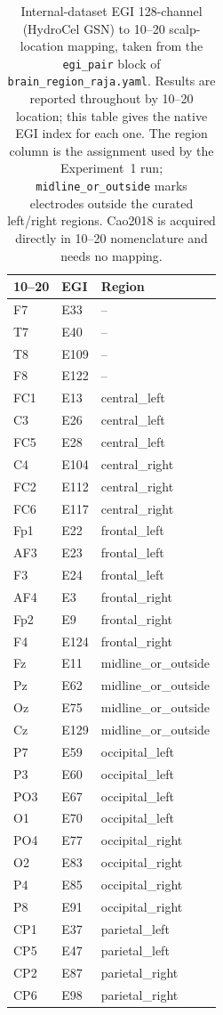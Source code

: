 \begin{table}[ht]
\centering
\footnotesize
\caption{Internal-dataset EGI 128-channel (HydroCel GSN) to 10--20 scalp-location mapping, taken from the \texttt{egi\_pair} block of \texttt{brain\_region\_raja.yaml}. Results are reported throughout by 10--20 location; this table gives the native EGI index for each one. The region column is the assignment used by the Experiment~1 run; \texttt{midline\_or\_outside} marks electrodes outside the curated left/right regions. Cao2018 is acquired directly in 10--20 nomenclature and needs no mapping.}
\label{tab:egi_map}
\begin{tabular}{lll}
\toprule
10--20 & EGI & Region \\
\midrule
F7 & E33 & -- \\
T7 & E40 & -- \\
T8 & E109 & -- \\
F8 & E122 & -- \\
FC1 & E13 & central\_left \\
C3 & E26 & central\_left \\
FC5 & E28 & central\_left \\
C4 & E104 & central\_right \\
FC2 & E112 & central\_right \\
FC6 & E117 & central\_right \\
Fp1 & E22 & frontal\_left \\
AF3 & E23 & frontal\_left \\
F3 & E24 & frontal\_left \\
AF4 & E3 & frontal\_right \\
Fp2 & E9 & frontal\_right \\
F4 & E124 & frontal\_right \\
Fz & E11 & midline\_or\_outside \\
Pz & E62 & midline\_or\_outside \\
Oz & E75 & midline\_or\_outside \\
Cz & E129 & midline\_or\_outside \\
P7 & E59 & occipital\_left \\
P3 & E60 & occipital\_left \\
PO3 & E67 & occipital\_left \\
O1 & E70 & occipital\_left \\
PO4 & E77 & occipital\_right \\
O2 & E83 & occipital\_right \\
P4 & E85 & occipital\_right \\
P8 & E91 & occipital\_right \\
CP1 & E37 & parietal\_left \\
CP5 & E47 & parietal\_left \\
CP2 & E87 & parietal\_right \\
CP6 & E98 & parietal\_right \\
\bottomrule
\end{tabular}
\end{table}
